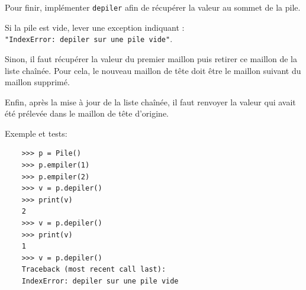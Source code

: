 \documentclass[a4paper,17pt]{extarticle}
\begin{document}
    Pour finir, implémenter \texttt{depiler} afin de récupérer la valeur au
sommet de la pile.

Si la pile est vide, lever une exception indiquant :
\texttt{"IndexError:\ depiler\ sur\ une\ pile\ vide"}.

Sinon, il faut récupérer la valeur du premier maillon puis retirer ce
maillon de la liste chaînée. Pour cela, le nouveau maillon de tête doit
être le maillon suivant du maillon supprimé.

Enfin, après la mise à jour de la liste chaînée, il faut renvoyer la
valeur qui avait été prélevée dans le maillon de tête d'origine.

Exemple et tests:

\begin{verbatim}
    >>> p = Pile()
    >>> p.empiler(1)
    >>> p.empiler(2)
    >>> v = p.depiler()
    >>> print(v)
    2
    >>> v = p.depiler()
    >>> print(v)
    1
    >>> v = p.depiler()
    Traceback (most recent call last):
    IndexError: depiler sur une pile vide
\end{verbatim}
\end{document}
